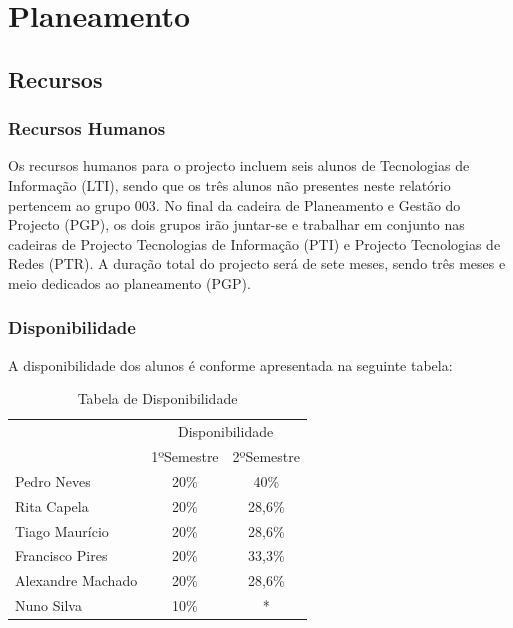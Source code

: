 \documentclass[12pt, a4paper, twoside]{report} %
\begin{document}
\chapter{Planeamento}

\section{Recursos}

\subsection{Recursos Humanos}

Os recursos humanos para o projecto incluem seis alunos de Tecnologias de Informação (LTI), sendo que os três alunos não presentes neste relatório pertencem ao grupo 003. 
No final da cadeira de Planeamento e Gestão do Projecto (PGP), os dois grupos irão juntar-se e trabalhar em conjunto nas cadeiras de Projecto Tecnologias de Informação (PTI) e Projecto Tecnologias de Redes (PTR). A duração total do projecto será de sete meses, sendo três meses e meio dedicados ao planeamento (PGP).

\subsection{Disponibilidade}

A disponibilidade dos alunos é conforme apresentada na seguinte tabela:

\begin{table}[h]
\centering
\begin{tabular}{|l|c c|}
\hline
\multirow{2}{*}{} & \multicolumn{2}{c|}{Disponibilidade} \\ \cline{2-3} 
						& 1ºSemestre        & 2ºSemestre       \\ \hline
Pedro Neves       		& 20\%              & 40\%             \\ \hline
Rita Capela       		& 20\%              & 28,6\%           \\ \hline
Tiago Maurício    		& 20\%              & 28,6\%           \\ \hline
Francisco Pires   		& 20\%              & 33,3\%           \\ \hline
Alexandre Machado 		& 20\%              & 28,6\%           \\ \hline
Nuno Silva\footnotemark	& 10\%              & *                \\ \hline
\end{tabular}
\caption{Tabela de Disponibilidade}
\label{disponibilidade}
\end{table}
\end{document}
